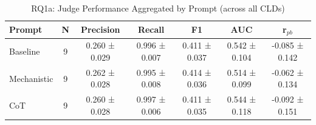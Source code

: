 \begin{table}[htbp]
\centering
\caption{RQ1a: Judge Performance Aggregated by Prompt (across all CLDs)}
\label{tab:rq1a_by_prompt}
\begin{tabular}{lcccccc}
\toprule
\textbf{Prompt} & \textbf{N} & \textbf{Precision} & \textbf{Recall} & \textbf{F1} & \textbf{AUC} & \textbf{r$_{pb}$} \\
\midrule
Baseline & 9 & 0.260 ± 0.029 & 0.996 ± 0.007 & 0.411 ± 0.037 & 0.542 ± 0.104 & -0.085 ± 0.142 \\
Mechanistic & 9 & 0.262 ± 0.028 & 0.995 ± 0.008 & 0.414 ± 0.036 & 0.514 ± 0.099 & -0.062 ± 0.134 \\
CoT & 9 & 0.260 ± 0.028 & 0.997 ± 0.006 & 0.411 ± 0.035 & 0.544 ± 0.118 & -0.092 ± 0.151 \\
\bottomrule
\end{tabular}
\end{table}